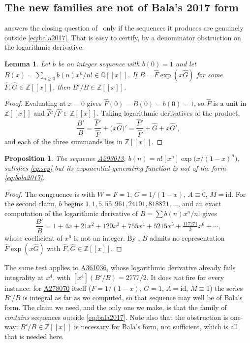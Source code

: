 \documentclass[11pt,a4paper]{article}
\theoremstyle{plain}
\newtheorem{proposition}[theorem]{Proposition}
\newtheorem{lemma}[theorem]{Lemma}
\theoremstyle{definition}
\newcommand{\Z}{\mathbb{Z}}
\newcommand{\Q}{\mathbb{Q}}
\newcommand{\coeff}[1]{[x^{#1}]}
\newcommand{\oeis}[1]{\href{https://oeis.org/#1}{\underline{#1}}}
\begin{document}
\subsection{The new families are not of Bala's 2017 form}\label{sec:notbala}

 answers the closing question of~\cite{bala2017} only if the sequences it
produces are genuinely outside \eqref{eq:bala2017}. That is easy to certify, by a
denominator obstruction on the logarithmic derivative.

\begin{lemma}\label{lem:obstruction}
Let $b$ be an integer sequence with $b(0)=1$ and let
$B(x)=\sum_{n\ge0}b(n)x^{n}/n!\in\Q[[x]]$. If $B=\widehat F\exp(x\widehat G)$ for some
$\widehat F,\widehat G\in\Z[[x]]$, then $B'/B\in\Z[[x]]$.
\end{lemma}

\begin{proof}
Evaluating at $x=0$ gives $\widehat F(0)=B(0)=b(0)=1$, so $\widehat F$ is a unit in
$\Z[[x]]$ and $\widehat F'/\widehat F\in\Z[[x]]$. Taking logarithmic derivatives of the
product,
\[
  \frac{B'}{B}=\frac{\widehat F'}{\widehat F}+\big(x\widehat G\big)'
             =\frac{\widehat F'}{\widehat F}+\widehat G+x\widehat G',
\]
and each of the three summands lies in $\Z[[x]]$.
\end{proof}

\begin{proposition}\label{prop:A293013outside}
The sequence \oeis{A293013}, $b(n)=n!\coeff{n}\exp\big(x/(1-x)^{n}\big)$, satisfies
\eqref{eq:scp} but its exponential generating function is not of the form
\eqref{eq:bala2017}.
\end{proposition}

\begin{proof}
The congruence is  with $W=F=1$, $G=1/(1-x)$, $A\equiv0$, $M=\mathrm{id}$.
For the second claim, $b$ begins $1,1,5,55,961,24101,818821,\dots$, and an exact
computation of the logarithmic derivative of $B=\sum b(n)x^{n}/n!$ gives
\[
  \frac{B'}{B}=1+4x+21x^{2}+120x^{3}+755x^{4}+5215x^{5}+\tfrac{117271}{3}x^{6}+\cdots,
\]
whose coefficient of $x^{6}$ is not an integer. By , $B$ admits no
representation $\widehat F\exp(x\widehat G)$ with $\widehat F,\widehat G\in\Z[[x]]$.
\end{proof}

The same test applies to \oeis{A361036}, whose logarithmic derivative already fails
integrality at $x^{4}$, with $\coeff{4}(B'/B)=2777/2$. It does \emph{not} fire for every
instance: for \oeis{A278070} itself ($F=1/(1-x)$, $G=1$, $A=\mathrm{id}$, $M\equiv1$) the
series $B'/B$ is integral as far as we computed, so that sequence may well be of Bala's
form. The claim we need, and the only one we make, is that the family of
 \emph{contains} sequences outside \eqref{eq:bala2017}. Note also that the
obstruction is one-way: $B'/B\in\Z[[x]]$ is necessary for Bala's form, not sufficient,
which is all that is needed here.
\end{document}
